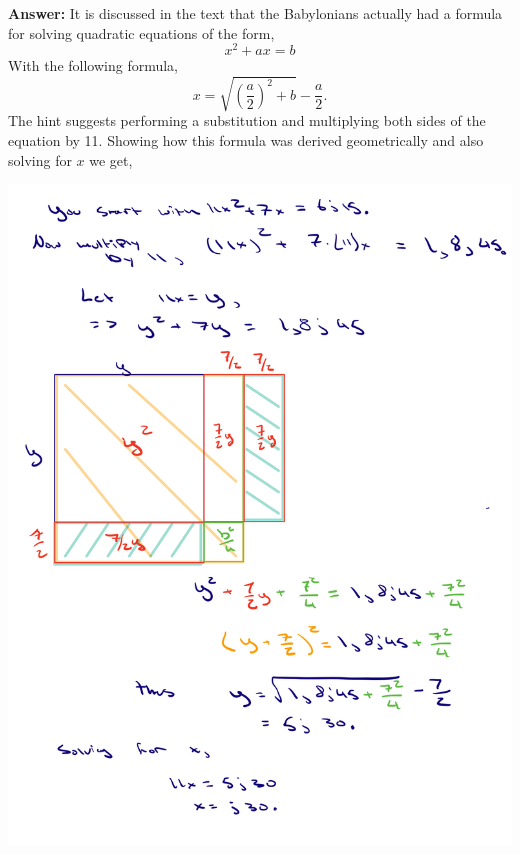 \documentclass[12pt]{article}
\theoremstyle{homework}
\begin{document}
\begin{enumerate}
\textbf{Answer:} It is discussed in the text that the Babylonians actually had a formula for solving quadratic equations of the form,
\begin{equation*}
  x^2 +ax = b
\end{equation*}
With the following formula,
\begin{equation*}
  x = \sqrt{(\frac{a}{2})^2 + b} - \frac{a}{2}.
\end{equation*}
The hint suggests performing a substitution and multiplying both sides of the equation by 11. Showing how this formula was derived geometrically and 
also solving for $x$ we get,
\begin{center}
  \includegraphics[width = .75\textwidth]{square.png}        
\end{center}

\vspace{.5in}
\end{enumerate}
\vspace{.5in}
\end{document}
